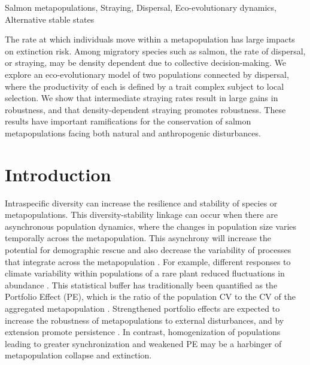 \documentclass{revtex4}
\begin{document}
\maketitle

\centerline{Salmon metapopulations, Straying, Dispersal, Eco-evolutionary dynamics, Alternative stable states}
\vspace{2mm}
 The rate at which individuals move within a metapopulation has large impacts on extinction risk. Among migratory species such as salmon, the rate of dispersal, or straying, may be density dependent due to collective decision-making. We explore an eco-evolutionary model of two populations connected by dispersal, where the productivity of each is defined by a trait complex subject to local selection. We show that intermediate straying rates result in large gains in robustness, and that density-dependent straying promotes robustness. These results have important ramifications for the conservation of salmon metapopulations facing both natural and anthropogenic disturbances.\\


\section{Introduction}

Intraspecific diversity can increase the resilience and stability of species or metapopulations. 
This diversity-stability linkage can occur when there are asynchronous population dynamics, where the changes in population size varies temporally across the metapopulation. 
This asynchrony will increase the potential for demographic rescue \citep{Brown:1977gk,Earn:2000fm} and also decrease the variability of processes that integrate across the metapopulation \citep{Anonymous:2015gf}. 
For example, different responses to climate variability within populations of a rare plant reduced fluctuations in abundance \citep{Abbott:2017hl}. 
This statistical buffer has traditionally been quantified as the Portfolio Effect (PE), which is the ratio of the population CV to the CV of the aggregated metapopulation \citep{Thibaut:2012km}. 
Strengthened portfolio effects are expected to increase the robustness of metapopulations to external disturbances, and by extension promote persistence \citep{Thibaut:2012km}.
In contrast, homogenization of populations leading to greater synchronization and weakened PE may be a harbinger of metapopulation collapse and extinction.
\end{document}
